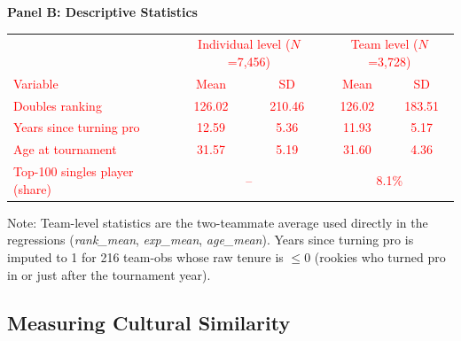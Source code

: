 \documentclass[10pt]{article}
\begin{document}
\begin{table}[h!]
\begin{threeparttable}
\vspace{10pt}
\textbf{Panel B: Descriptive Statistics}\\[2pt]
\textcolor{red}{
\begin{tabular}{lcccc}
\toprule
 & \multicolumn{2}{c}{Individual level ($N$=7,456)} & \multicolumn{2}{c}{Team level ($N$=3,728)} \\
Variable & Mean & SD & Mean & SD \\
\midrule
Doubles ranking            & 126.02 & 210.46 & 126.02 & 183.51 \\
Years since turning pro    & 12.59  & 5.36   & 11.93  & 5.17   \\
Age at tournament          & 31.57  & 5.19   & 31.60  & 4.36   \\
Top-100 singles player (share) & \multicolumn{2}{c}{--} & \multicolumn{2}{c}{8.1\%} \\
\bottomrule
\end{tabular}
}
\begin{tablenotes}
\small
\item Note: %
Team-level statistics are the two-teammate average used directly in the regressions (\textit{rank\_mean}, \textit{exp\_mean}, \textit{age\_mean}). Years since turning pro is imputed to 1 for 216 team-obs whose raw tenure is $\le 0$ (rookies who turned pro in or just after the tournament year). %
\end{tablenotes}
\end{threeparttable}
\end{table}



\subsection{Measuring Cultural Similarity}
\end{document}

